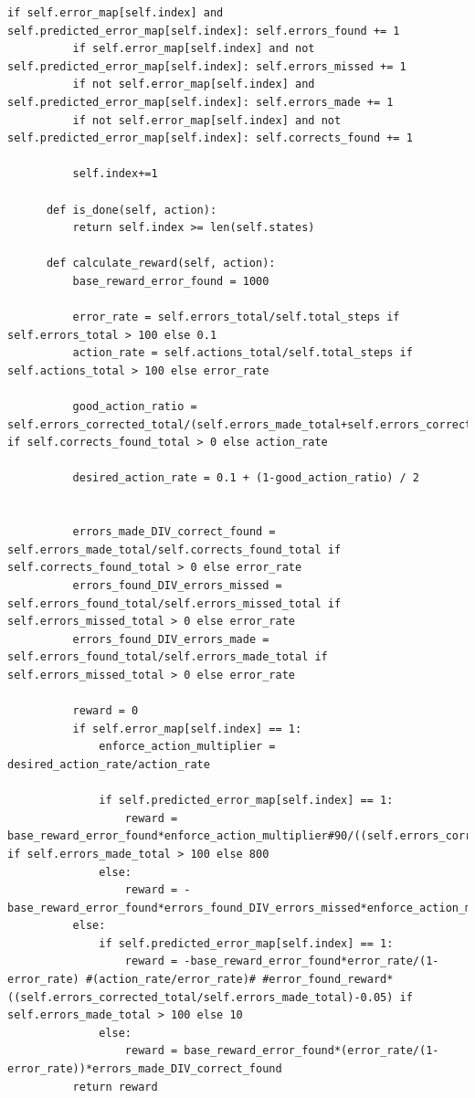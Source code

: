 \documentclass[oneside,bibliography=totocnumbered,BCOR=5mm]{scrbook}%
\theoremstyle{definition}
\theoremstyle{definition}
\theoremstyle{definition}
\theoremstyle{definition}
\theoremstyle{definition}
\theoremstyle{definition}
\begin{document}
\begin{appendix}
\begin{lstlisting}[caption={DNA-Environment für Fehlererkennung in einem einzigen Durchlauf}]
          if self.error_map[self.index] and self.predicted_error_map[self.index]: self.errors_found += 1
          if self.error_map[self.index] and not self.predicted_error_map[self.index]: self.errors_missed += 1
          if not self.error_map[self.index] and self.predicted_error_map[self.index]: self.errors_made += 1
          if not self.error_map[self.index] and not self.predicted_error_map[self.index]: self.corrects_found += 1
          
          self.index+=1
  
      def is_done(self, action):
          return self.index >= len(self.states)
      
      def calculate_reward(self, action):
          base_reward_error_found = 1000
          
          error_rate = self.errors_total/self.total_steps if self.errors_total > 100 else 0.1
          action_rate = self.actions_total/self.total_steps if self.actions_total > 100 else error_rate
  
          good_action_ratio = self.errors_corrected_total/(self.errors_made_total+self.errors_corrected_total) if self.corrects_found_total > 0 else action_rate
          
          desired_action_rate = 0.1 + (1-good_action_ratio) / 2
  
          
          errors_made_DIV_correct_found = self.errors_made_total/self.corrects_found_total if self.corrects_found_total > 0 else error_rate
          errors_found_DIV_errors_missed = self.errors_found_total/self.errors_missed_total if self.errors_missed_total > 0 else error_rate
          errors_found_DIV_errors_made = self.errors_found_total/self.errors_made_total if self.errors_missed_total > 0 else error_rate
          
          reward = 0
          if self.error_map[self.index] == 1:
              enforce_action_multiplier = desired_action_rate/action_rate
  
              if self.predicted_error_map[self.index] == 1:
                  reward = base_reward_error_found*enforce_action_multiplier#90/((self.errors_corrected_total/self.errors_made_total)) if self.errors_made_total > 100 else 800 
              else:
                  reward = -base_reward_error_found*errors_found_DIV_errors_missed*enforce_action_multiplier
          else:
              if self.predicted_error_map[self.index] == 1:
                  reward = -base_reward_error_found*error_rate/(1-error_rate) #(action_rate/error_rate)# #error_found_reward*((self.errors_corrected_total/self.errors_made_total)-0.05) if self.errors_made_total > 100 else 10
              else:
                  reward = base_reward_error_found*(error_rate/(1-error_rate))*errors_made_DIV_correct_found
          return reward   
\end{lstlisting}



\end{appendix}
\end{document}

